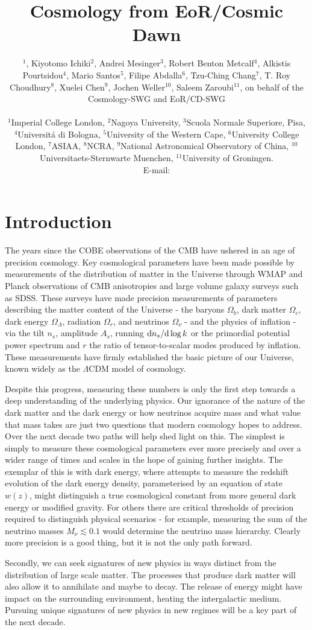 \documentclass{PoS}
\title{Cosmology from EoR/Cosmic Dawn}
\author{\speaker{Jonathan Pritchard}$^1$, Kiyotomo Ichiki$^2$, Andrei Mesinger$^3$, Robert Benton Metcalf$^4$, Alkistis Pourtsidou$^4$, Mario Santos$^5$, Filipe Abdalla$^6$, Tzu-Ching Chang$^7$, T. Roy Choudhury$^8$, Xuelei Chen$^9$, Jochen Weller$^{10}$, Saleem Zaroubi$^{11}$,
on behalf of the Cosmology-SWG and EoR/CD-SWG


        

\\
        $^1$Imperial College London,
        $^2$Nagoya University,
        $^3$Scuola Normale Superiore, Pisa,
        $^4$Universit\'{a} di Bologna,
        $^5$University of the Western Cape,
        $^6$University College London,
        $^7$ASIAA,
        $^8$NCRA,
        $^9$National Astronomical Observatory of China,
        $^{10}$ Universitaets-Sternwarte Muenchen,
        $^{11}$University of Groningen.
        \\
        E-mail: \email{j.pritchard@imperial.ac.uk}}
\newcommand{\ud}{{\rm d}}
\begin{document}
\section{Introduction}

The years since the COBE observations of the CMB have ushered in an age of precision cosmology. Key cosmological parameters have been made possible by measurements of the distribution of matter in the Universe through WMAP and Planck observations of CMB anisotropies and large volume galaxy surveys such as SDSS. These surveys have made precision measurements of parameters describing the matter content of the Universe - the baryons $\Omega_b$, dark matter $\Omega_c$, dark energy $\Omega_\Lambda$, radiation $\Omega_r$, and neutrinos $\Omega_\nu$ - and the physics of inflation - via the tilt $n_s$, amplitude $A_s$, running $\ud n_s/\ud\log k$ or the primordial potential power spectrum and $r$ the ratio of tensor-to-scalar modes produced by inflation. These measurements have firmly established the basic picture of our Universe, known widely as the $\Lambda$CDM model of cosmology.

Despite this progress, measuring these numbers is only the first step towards a deep understanding of the underlying physics. Our ignorance of the nature of the dark matter and the dark energy or how neutrinos acquire mass and what value that mass takes are just two questions that modern cosmology hopes to address. Over the next decade two paths will help shed light on this. The simplest is simply to measure these cosmological parameters ever more precisely and over a wider range of times and scales in the hope of gaining further insights. The exemplar of this is with dark energy, where attempts to measure the redshift evolution of the dark energy density, parameterised by an equation of state $w(z)$, might distinguish a true cosmological constant from more general dark energy or modified gravity. For others there are critical thresholds of precision required to distinguish physical scenarios - for example, measuring the sum of the neutrino masses $M_\nu\lesssim0.1$ would determine the neutrino mass hierarchy. Clearly more precision is a good thing, but it is not the only path forward.

Secondly, we can seek signatures of new physics in ways distinct from the distribution of large scale matter. The processes that produce dark matter will also allow it to annihilate and maybe to decay. The release of energy might have impact on the surrounding environment, heating the intergalactic medium. Pursuing unique signatures of new physics in new regimes will be a key part of the next decade.
\end{document}
